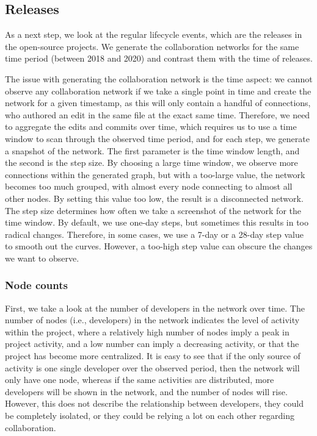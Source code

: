\subsection{Releases}
\label{sec:releases}
As a next step, we look at the regular lifecycle events, which are the releases in the open-source projects. We generate the collaboration networks for the same time period (between 2018 and 2020) and contrast them with the time of releases.

The issue with generating the collaboration network is the time aspect: we cannot observe any collaboration network if we take a single point in time and create the network for a given timestamp, as this will only contain a handful of connections, who authored an edit in the same file at the exact same time. Therefore, we need to aggregate the edits and commits over time, which requires us to use a time window to scan through the observed time period, and for each step, we generate a snapshot of the network. The first parameter is the time window length, and the second is the step size. By choosing a large time window, we observe more connections within the generated graph, but with a too-large value, the network becomes too much grouped, with almost every node connecting to almost all other nodes. By setting this value too low, the result is a disconnected network. The step size determines how often we take a screenshot of the network for the time window. By default, we use one-day steps, but sometimes this results in too radical changes. Therefore, in some cases, we use a 7-day or a 28-day step value to smooth out the curves. However, a too-high step value can obscure the changes we want to observe.

\subsubsection{Node counts}

First, we take a look at the number of developers in the network over time. The number of nodes (i.e., developers) in the network indicates the level of activity within the project, where a relatively high number of nodes imply a peak in project activity, and a low number can imply a decreasing activity, or that the project has become more centralized. It is easy to see that if the only source of activity is one single developer over the observed period, then the network will only have one node, whereas if the same activities are distributed, more developers will be shown in the network, and the number of nodes will rise. However, this does not describe the relationship between developers, they could be completely isolated, or they could be relying a lot on each other regarding collaboration.

